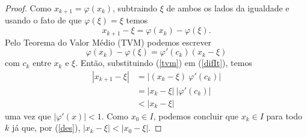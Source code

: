 \begin{proof}
    Como $x_{k+1} = \varphi(x_k)$, subtraindo $\xi$ de ambos os lados da igualdade e usando o fato de que $\varphi(\xi)=\xi$ temos
    \begin{equation}\label{difIt}
        x_{k+1} - \xi = \varphi(x_k) - \varphi(\xi).
    \end{equation}
    Pelo Teorema do Valor Médio (TVM) podemos escrever \\
    \begin{equation}\label{tvm}
        \varphi(x_k) - \varphi(\xi) = \varphi'(c_k) (x_k - \xi)
    \end{equation}
    com $c_k$ entre $x_k$ e $\xi$. Então, substituindo (\ref{tvm}) em (\ref{difIt}), temos
    \begin{align}\label{des}
        |x_{k+1} - \xi| & = |(x_k - \xi) \ \varphi'(c_k)| \nonumber \\
                        & = |x_k - \xi| \ |\varphi'(c_k)|           \\
                        & < |x_k - \xi| \nonumber
    \end{align}
    uma vez que $|\varphi'(x)| < 1$. Como $x_0 \in I$, podemos concluir que $x_k \in I$ para todo $k$ já que, por (\ref{des}), $|x_k - \xi| < |x_0 - \xi|$.


\end{proof}

